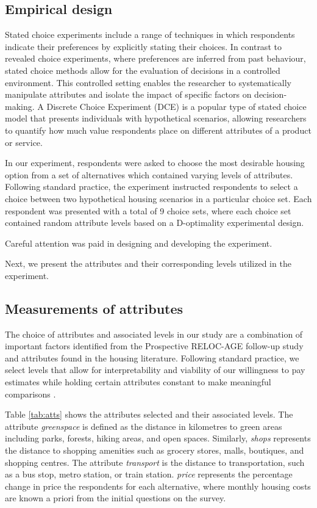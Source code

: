 \documentclass[3p,11pt ]{elsarticle}
\begin{document}
\subsection{Empirical design}

Stated choice experiments include a range of techniques in which respondents indicate their preferences by explicitly stating their choices. In contrast to revealed choice experiments, where preferences are inferred from past behaviour, stated choice methods allow for the evaluation of decisions in a controlled environment. This controlled setting enables the researcher to systematically manipulate attributes and isolate the impact of specific factors on decision-making. A Discrete Choice Experiment (DCE) is a popular type of stated choice model that presents individuals with hypothetical scenarios, allowing researchers to quantify how much value respondents place on different attributes of a product or service.

In our experiment,
respondents were asked to choose the most desirable housing option from a set of alternatives which contained varying levels of attributes.
Following standard practice,
the experiment instructed respondents to select a choice between two hypothetical housing scenarios in a particular choice set.
Each respondent was presented with a total of 9 choice sets,
where each choice set contained random attribute levels based on a D-optimality experimental design.

Careful attention was paid in designing and developing the experiment.

Next,
we present the attributes and their corresponding levels utilized in the experiment.


\subsection{Measurements of attributes}


The choice of attributes and associated levels in our study are a combination of important factors identified from the Prospective RELOC-AGE follow-up study and attributes found in the housing literature.
Following standard practice,
we select levels that allow for interpretability and viability of our willingness to pay estimates while holding certain attributes constant to make meaningful comparisons \citep{hensherAppliedChoiceAnalysis2015}.

Table \ref{tab:atts} shows the attributes selected and their associated levels.
The attribute \textit{greenspace} is defined as the distance in kilometres to green areas including parks, forests, hiking areas, and open spaces.
Similarly,
\textit{shops} represents the distance to shopping amenities such as grocery stores, malls, boutiques, and shopping centres.
The attribute \textit{transport} is the distance to transportation, such as a bus stop, metro station, or train station.
\textit{price} represents the percentage change in price the respondents for each alternative,
where monthly housing costs are known a priori from the initial questions on the survey.
\end{document}
